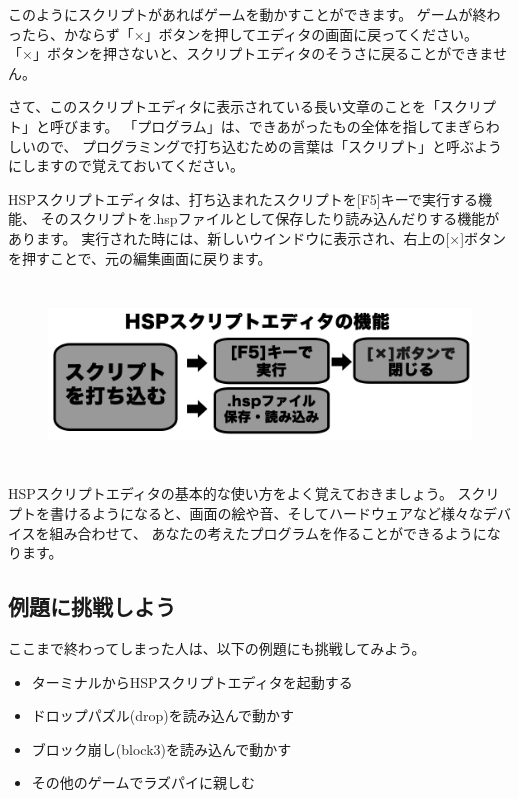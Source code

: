 このようにスクリプトがあればゲームを動かすことができます。
ゲームが終わったら、かならず「×」ボタンを押してエディタの画面に戻ってください。
「×」ボタンを押さないと、スクリプトエディタのそうさに戻ることができません。

さて、このスクリプトエディタに表示されている長い文章のことを「スクリプト」と呼びます。
「プログラム」は、できあがったもの全体を指してまぎらわしいので、
プログラミングで打ち込むための言葉は「スクリプト」と呼ぶようにしますので覚えておいてください。

HSPスクリプトエディタは、打ち込まれたスクリプトを[F5]キーで実行する機能、
そのスクリプトを.hspファイルとして保存したり読み込んだりする機能があります。
実行された時には、新しいウインドウに表示され、右上の[×]ボタンを押すことで、元の編集画面に戻ります。

\begin{figure}[H]
  \begin{center}
    \includegraphics[width=15.533cm,height=4.86cm]{images/chap02/text02-img013.png}
  \end{center}
  \label{fig:hsp_shoot3}
\end{figure}

HSPスクリプトエディタの基本的な使い方をよく覚えておきましょう。
スクリプトを書けるようになると、画面の絵や音、そしてハードウェアなど様々なデバイスを組み合わせて、
あなたの考えたプログラムを作ることができるようになります。
\clearpage

% 
% 
% 
\subsection{例題に挑戦しよう}

ここまで終わってしまった人は、以下の例題にも挑戦してみよう。

\begin{itemize}
  \item ターミナルからHSPスクリプトエディタを起動する
  \item ドロップパズル(drop)を読み込んで動かす
  \item ブロック崩し(block3)を読み込んで動かす
  \item その他のゲームでラズパイに親しむ
\end{itemize}

